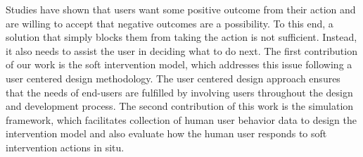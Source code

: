 \documentclass[doctor]{thesis} %
\theoremstyle{plain}
\begin{document}
Studies have shown that users want some positive outcome from their action and are willing to accept that negative outcomes are a possibility\cite{good2005stopping,debatin2009facebook,byrne2016}. To this end, a solution that simply blocks them from taking the action is not sufficient. Instead, it also needs to assist the user in deciding what to do next. The first contribution of our work is the soft intervention model, which addresses this issue following a user centered design methodology. The user centered design approach ensures that the needs of end-users are fulfilled by involving users throughout the design and development process. The second contribution of this work is the simulation framework, which facilitates collection of human user behavior data to design the intervention model and also evaluate how the human user responds to soft intervention actions in situ.
%
%
%
%
\end{document}
